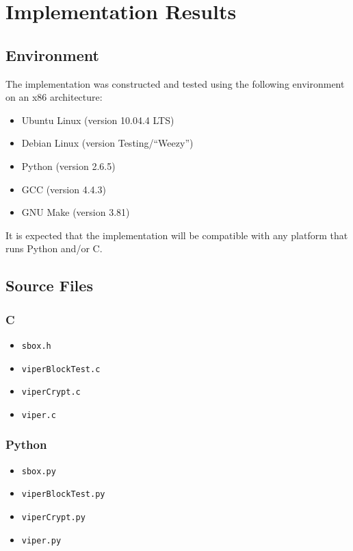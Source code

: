 \section{Implementation Results}

\subsection{Environment}


The implementation was constructed and tested using the following environment on an x86 architecture:
\begin{itemize}
\item Ubuntu Linux (version 10.04.4 LTS)
\item Debian Linux (version Testing/\enquote{Weezy})
\item Python (version 2.6.5)
\item GCC (version 4.4.3)
\item GNU Make (version 3.81)
\end{itemize}

It is expected that the implementation will be compatible with any platform that runs Python and/or C.

\subsection{Source Files}
\subsubsection{C}
\begin{itemize}
\item \texttt{sbox.h}
\item \texttt{viperBlockTest.c}
\item \texttt{viperCrypt.c}
\item \texttt{viper.c}
\end{itemize}
\subsubsection{Python}
\begin{itemize}
\item \texttt{sbox.py}
\item \texttt{viperBlockTest.py}
\item \texttt{viperCrypt.py}
\item \texttt{viper.py}
\end{itemize}

